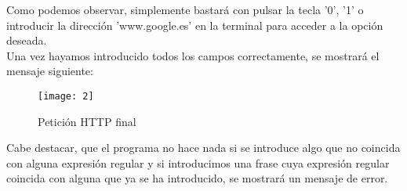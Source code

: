	Como podemos observar, simplemente bastará con pulsar la tecla '0', '1' o introducir la dirección 'www.google.es' en la terminal para acceder a la opción deseada. \\
	
	
	Una vez hayamos introducido todos los campos correctamente, se mostrará el mensaje siguiente:
	
	\begin{figure}[h]
		\centering
		\texttt{[image: 2]}
		\caption{Petición HTTP final}
	\end{figure}
	
	Cabe destacar, que el programa no hace nada si se introduce algo que no coincida con alguna expresión regular y si introducimos una frase cuya expresión regular coincida con alguna que ya se ha introducido, se mostrará un mensaje de error.
	
	
